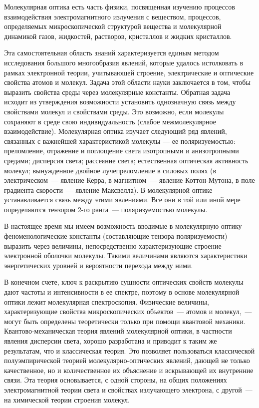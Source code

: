 ﻿
\thispagestyle{empty}

Молекулярная оптика есть часть физики, посвященная изучению
процессов взаимодействия электромагнитного излучения с веществом,
процессов, определяемых микроскопической структурой вещества и
молекулярной динамикой газов, жидкостей, растворов,
кристаллов и жидких кристаллов.

Эта самостоятельная область знаний характеризуется единым методом
исследования большого многообразия явлений, которые удалось
истолковать в рамках электронной теории, учитывающей строение,
электрические и оптические свойства атомов и молекул. Задача этой
области науки заключается в том, чтобы выразить свойства среды
через молекулярные константы. Обратная задача исходит из
утверждения возможности установить однозначную связь между
свойствами молекул и свойствами среды. Это возможно, если
молекулы сохраняют в среде свою индивидуальность (слабое
межмолекулярное взаимодействие). Молекулярная оптика изучает
следующий ряд явлений, связанных с важнейшей характеристикой
молекулы --- ее поляризуемостью: преломление, отражение и
поглощение света изотропными и анизотропными средами;
дисперсия света; рассеяние света; естественная оптическая
активность молекул; вынужденное двойное лучепреломление в силовых
полях (в электрическом~--- явление Керра, в магнитном~--- явление
Коттон-Мутона, в поле градиента скорости~--- явление Максвелла). В
молекулярной оптике устанавливается связь между этими явлениями.
Все они в той или иной мере определяются тензором 2-го ранга~---
поляризуемостью молекулы.

В настоящее время мы имеем возможность вводимые в молекулярную
оптику феноменологические константы (составляющие тензора
поляризуемости) выразить через величины, непосредственно
характеризующие строение электронной оболочки молекулы. Такими
величинами являются характеристики энергетических уровней и
вероятности перехода между ними.

В конечном счете, ключ к раскрытию сущности оптических свойств
молекулы дают частоты и интенсивности в ее спектре, поэтому в
основе молекулярной оптики лежит молекулярная спектроскопия.
Физические величины, характеризующие свойства микроскопических
объектов~--- атомов и молекул,~--- могут быть определены
теоретически только при помощи квантовой механики.
Квантово-механическая теория явлений молекулярной оптики, в
частности явления дисперсии света, хорошо разработана и приводит
к таким же результатам, что и классическая теория. Это позволяет
пользоваться классической полуэмпирической теорией
молекулярно-оптических явлений, дающей не только качественное, но
и количественное их объяснение и вскрывающей их внутренние
связи. Эта теория основывается, с одной стороны, на общих
положениях электромагнитной теории света и свойствах
излучающего электрона, с другой~--- на химической теории строения
молекул.

